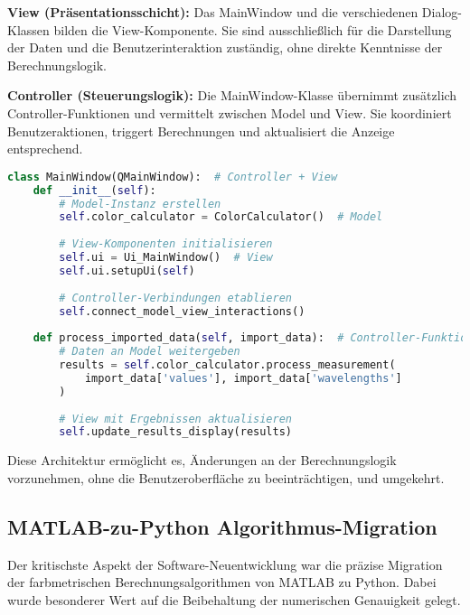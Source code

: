 \textbf{View (Präsentationsschicht):} Das MainWindow und die verschiedenen Dialog-Klassen bilden die View-Komponente. Sie sind ausschließlich für die Darstellung der Daten und die Benutzerinteraktion zuständig, ohne direkte Kenntnisse der Berechnungslogik.

\textbf{Controller (Steuerungslogik):} Die MainWindow-Klasse übernimmt zusätzlich Controller-Funktionen und vermittelt zwischen Model und View. Sie koordiniert Benutzeraktionen, triggert Berechnungen und aktualisiert die Anzeige entsprechend.

\begin{lstlisting}[language=Python, caption=MVC-Architektur Implementation, frame=single]
class MainWindow(QMainWindow):  # Controller + View
    def __init__(self):
        # Model-Instanz erstellen
        self.color_calculator = ColorCalculator()  # Model
        
        # View-Komponenten initialisieren
        self.ui = Ui_MainWindow()  # View
        self.ui.setupUi(self)
        
        # Controller-Verbindungen etablieren
        self.connect_model_view_interactions()
    
    def process_imported_data(self, import_data):  # Controller-Funktion
        # Daten an Model weitergeben
        results = self.color_calculator.process_measurement(
            import_data['values'], import_data['wavelengths']
        )
        
        # View mit Ergebnissen aktualisieren
        self.update_results_display(results)
\end{lstlisting}

Diese Architektur ermöglicht es, Änderungen an der Berechnungslogik vorzunehmen, ohne die Benutzeroberfläche zu beeinträchtigen, und umgekehrt.

\subsection{MATLAB-zu-Python Algorithmus-Migration}

Der kritischste Aspekt der Software-Neuentwicklung war die präzise Migration der farbmetrischen Berechnungsalgorithmen von MATLAB zu Python. Dabei wurde besonderer Wert auf die Beibehaltung der numerischen Genauigkeit gelegt.

